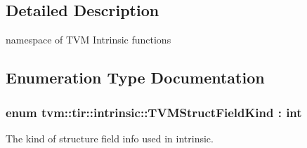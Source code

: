 \subsection{Detailed Description}
namespace of T\+VM Intrinsic functions 

\subsection{Enumeration Type Documentation}
\subsubsection[{\texorpdfstring{T\+V\+M\+Struct\+Field\+Kind}{TVMStructFieldKind}}]{\setlength{\rightskip}{0pt plus 5cm}enum {\bf tvm\+::tir\+::intrinsic\+::\+T\+V\+M\+Struct\+Field\+Kind} \+: int}\hypertarget{namespacetvm_1_1tir_1_1intrinsic_a7aee573af86b33b88d123fc26a40cdd9}{}\label{namespacetvm_1_1tir_1_1intrinsic_a7aee573af86b33b88d123fc26a40cdd9}


The kind of structure field info used in intrinsic. 

